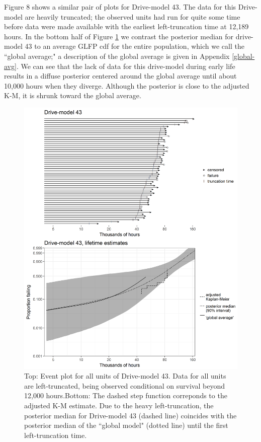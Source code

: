 \documentclass[12pt]{article}
\begin{document}
Figure 8 shows a similar pair of plots for Drive-model 43. The data for this Drive-model are heavily truncated; the observed units had run for quite some time before data were made available with the earliest left-truncation time at 12,189 hours. In the bottom half of Figure \ref{fig:ex-mod-43} we contrast the posterior median for drive-model 43 to an average GLFP cdf for the entire population, which we call the ``global average;" a description of the global average is given in Appendix \ref{global-avg}. We can see that the lack of data for this drive-model during early life results in a diffuse posterior centered around the global average until about 10,000 hours when they diverge. Although the posterior is close to the adjusted K-M, it is shrunk toward the global average.


\begin{figure}
\centering
\includegraphics[height=.8\textheight]{dm43-shrinkage.png}
\caption{\footnotesize Top: Event plot for all units of Drive-model 43. Data for all units are left-truncated, being observed conditional on survival beyond 12,000 hours.\hspace{\textwidth}Bottom: The dashed step function correponds to the adjusted K-M estimate. Due to the heavy left-truncation, the posterior median for Drive-model 43 (dashed line) coincides with the posterior median of the ``global model" (dotted line) until the first left-truncation time.}
\label{fig:ex-mod-43}
\end{figure}
\end{document}
